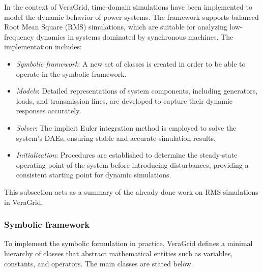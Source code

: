 In the context of VeraGrid, time-domain simulations have been implemented to model the dynamic behavior of power systems.
The framework supports balanced Root Mean Square (RMS) simulations, which are suitable for analyzing low-frequency dynamics in systems dominated by synchronous machines.
The implementation includes:

\begin{itemize}
    \item \textit{Symbolic framework}: A new set of classes is created in order to be able to operate in the symbolic framework.
    \item \textit{Models}: Detailed representations of system components, including generators, loads, and transmission lines, are developed to capture their dynamic
    responses accurately.
    \item \textit{Solver}: The implicit Euler integration method is employed to solve the system's DAEs, ensuring stable and accurate simulation results.
    \item \textit{Initialization}: Procedures are established to determine the steady-state operating point of the system before introducing disturbances,
    providing a consistent starting point for dynamic simulations.
\end{itemize}

This subsection acts as a summary of the already done work on RMS simulations in VeraGrid.

\subsubsection{Symbolic framework}
To implement the symbolic formulation in practice, VeraGrid defines a minimal hierarchy  of classes that abstract mathematical entities such as variables,
 constants, and operators. The main classes are stated below.

